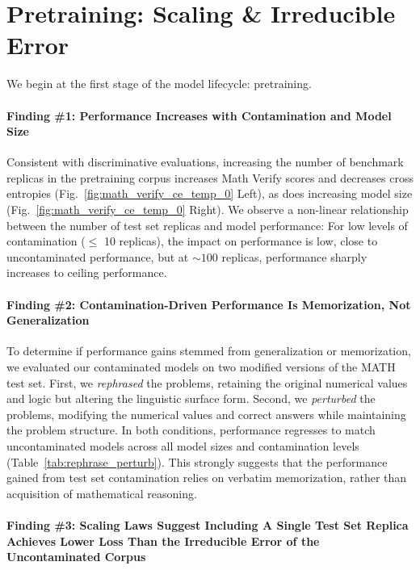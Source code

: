 \section{Pretraining: Scaling \& Irreducible Error}
\label{sec:pretraining}

We begin at the first stage of the model lifecycle: pretraining.

\paragraph{Finding \#1: Performance Increases with Contamination and Model Size} Consistent with discriminative evaluations, increasing the number of benchmark replicas in the pretraining corpus increases Math Verify scores and decreases cross entropies (Fig.~\ref{fig:math_verify_ce_temp_0} Left), as does increasing model size (Fig.~\ref{fig:math_verify_ce_temp_0} Right).
We observe a non-linear relationship between the number of test set replicas and model performance:
For low levels of contamination ($\leq$ 10 replicas), the impact on performance is low, close to uncontaminated performance, but at $\mathord{\sim}100$ replicas, performance sharply increases to ceiling performance.

\paragraph{Finding \#2: Contamination-Driven Performance Is Memorization, Not Generalization}
To determine if performance gains stemmed from generalization or memorization, we evaluated our contaminated models on two modified versions of the MATH test set. First, we \emph{rephrased} the problems, retaining the original numerical values and logic but altering the linguistic surface form. Second, we \emph{perturbed} the problems, modifying the numerical values and correct answers while maintaining the problem structure.
In both conditions, performance regresses to match uncontaminated models across all model sizes and contamination levels (Table~\ref{tab:rephrase_perturb}).
This strongly suggests that the performance gained from test set contamination relies on verbatim memorization, rather than acquisition of mathematical reasoning.

\paragraph{Finding \#3: Scaling Laws Suggest Including A Single Test Set Replica Achieves Lower Loss Than the Irreducible Error of the Uncontaminated Corpus}


